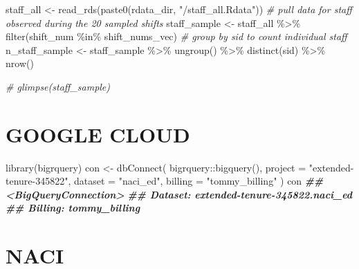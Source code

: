 \documentclass[
]{article}
\newenvironment{Shaded}{\begin{snugshade}}{\end{snugshade}}
\newcommand{\AttributeTok}[1]{\textcolor[rgb]{0.77,0.63,0.00}{#1}}
\newcommand{\CommentTok}[1]{\textcolor[rgb]{0.56,0.35,0.01}{\textit{#1}}}
\newcommand{\DocumentationTok}[1]{\textcolor[rgb]{0.56,0.35,0.01}{\textbf{\textit{#1}}}}
\newcommand{\FunctionTok}[1]{\textcolor[rgb]{0.00,0.00,0.00}{#1}}
\newcommand{\NormalTok}[1]{#1}
\newcommand{\OtherTok}[1]{\textcolor[rgb]{0.56,0.35,0.01}{#1}}
\newcommand{\SpecialCharTok}[1]{\textcolor[rgb]{0.00,0.00,0.00}{#1}}
\newcommand{\StringTok}[1]{\textcolor[rgb]{0.31,0.60,0.02}{#1}}
\begin{document}
\begin{Shaded}
\begin{Highlighting}[]
\NormalTok{staff\_all }\OtherTok{\textless{}{-}} \FunctionTok{read\_rds}\NormalTok{(}\FunctionTok{paste0}\NormalTok{(rdata\_dir, }\StringTok{"/staff\_all.Rdata"}\NormalTok{))}
\CommentTok{\# pull data for staff observed during the 20 sampled shifts}
\NormalTok{staff\_sample }\OtherTok{\textless{}{-}}\NormalTok{ staff\_all }\SpecialCharTok{\%\textgreater{}\%} 
  \FunctionTok{filter}\NormalTok{(shift\_num }\SpecialCharTok{\%in\%}\NormalTok{ shift\_nums\_vec)}
\CommentTok{\# group by sid to count individual staff}
\NormalTok{n\_staff\_sample }\OtherTok{\textless{}{-}}\NormalTok{ staff\_sample }\SpecialCharTok{\%\textgreater{}\%} 
  \FunctionTok{ungroup}\NormalTok{() }\SpecialCharTok{\%\textgreater{}\%} 
  \FunctionTok{distinct}\NormalTok{(sid) }\SpecialCharTok{\%\textgreater{}\%} 
  \FunctionTok{nrow}\NormalTok{()}

\CommentTok{\# glimpse(staff\_sample)}
\end{Highlighting}
\end{Shaded}

\hypertarget{google-cloud}{%
\section{GOOGLE CLOUD}\label{google-cloud}}

\begin{Shaded}
\begin{Highlighting}[]
\FunctionTok{library}\NormalTok{(bigrquery)}
\NormalTok{con }\OtherTok{\textless{}{-}} \FunctionTok{dbConnect}\NormalTok{(}
\NormalTok{    bigrquery}\SpecialCharTok{::}\FunctionTok{bigquery}\NormalTok{(),}
    \AttributeTok{project =} \StringTok{"extended{-}tenure{-}345822"}\NormalTok{,}
    \AttributeTok{dataset =} \StringTok{"naci\_ed"}\NormalTok{,}
    \AttributeTok{billing =} \StringTok{"tommy\_billing"}
\NormalTok{)}
\NormalTok{con}
\DocumentationTok{\#\# \textless{}BigQueryConnection\textgreater{}}
\DocumentationTok{\#\#   Dataset: extended{-}tenure{-}345822.naci\_ed}
\DocumentationTok{\#\#   Billing: tommy\_billing}
\end{Highlighting}
\end{Shaded}

\hypertarget{naci}{%
\section{NACI}\label{naci}}
\end{document}
